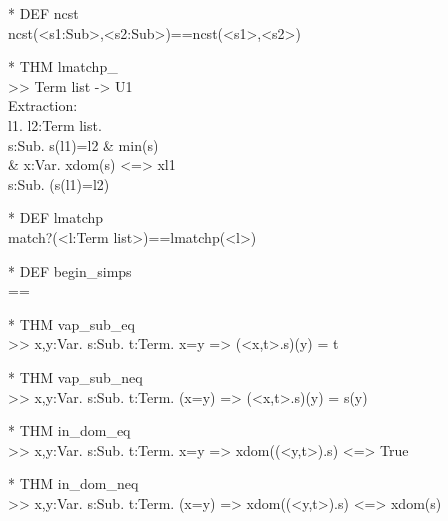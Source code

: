 \begin{prl*}
\>* DEF ncst\\
\>  ncst(<s1:Sub>,<s2:Sub>)==ncst(<s1>,<s2>)
\end{prl*}

\begin{prl*}
\>* THM lmatchp\_\\
\>  >> Term list -> U1\\
\>  Extraction:\\
\>  \mlambda{}l1. \mforall{}l2:Term list. \\
\>         \mexists{}s:Sub. s(l1)=l2 \& min(s)\\
\>                 \& \mforall{}x:Var. x\mepsilon{}dom(s) <=> x\mepsilon{}l1\\
\>         \mvee{} \mforall{}s:Sub. \mneg{}(s(l1)=l2)
\end{prl*}

\begin{prl*}
\>* DEF lmatchp\\
\>  match?(<l:Term list>)==lmatchp(<l>)
\end{prl*}

\begin{prl*}
\>* DEF begin\_simps\\
\>  ==
\end{prl*}

\begin{prl*}
\>* THM vap\_sub\_eq\\
\>  >> \mforall{}x,y:Var. \mforall{}s:Sub. \mforall{}t:Term. x=y => (<x,t>.s)(y) = t
\end{prl*}

\begin{prl*}
\>* THM vap\_sub\_neq\\
\>  >> \mforall{}x,y:Var. \mforall{}s:Sub. \mforall{}t:Term. \mneg{}(x=y) => (<x,t>.s)(y) = s(y)
\end{prl*}

\begin{prl*}
\>* THM in\_dom\_eq\\
\>  >> \mforall{}x,y:Var. \mforall{}s:Sub. \mforall{}t:Term. x=y => x\mepsilon{}dom((<y,t>).s) <=> True
\end{prl*}

\begin{prl*}
\>* THM in\_dom\_neq\\
\>  >> \mforall{}x,y:Var. \mforall{}s:Sub. \mforall{}t:Term. \mneg{}(x=y) => x\mepsilon{}dom((<y,t>).s) <=> x\mepsilon{}dom(s)
\end{prl*}

